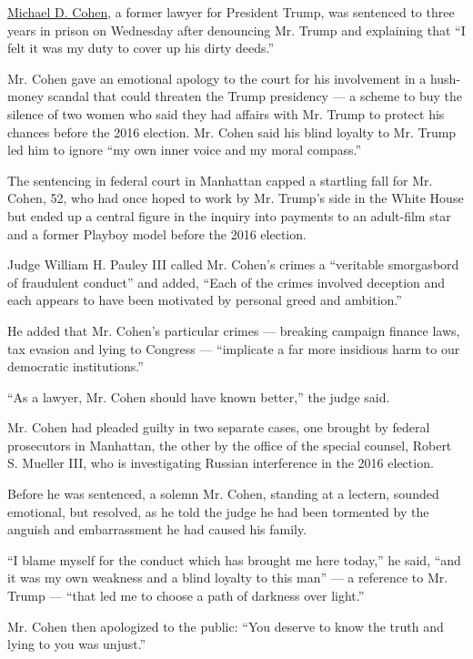 \href{https://www.nytimes.com/2020/07/21/nyregion/michael-cohen-trump-book.html}{Michael
D. Cohen}, a former lawyer for President Trump, was sentenced to three
years in prison on Wednesday after denouncing Mr. Trump and explaining
that ``I felt it was my duty to cover up his dirty deeds.''

Mr. Cohen gave an emotional apology to the court for his involvement in
a hush-money scandal that could threaten the Trump presidency --- a
scheme to buy the silence of two women who said they had affairs with
Mr. Trump to protect his chances before the 2016 election. Mr. Cohen
said his blind loyalty to Mr. Trump led him to ignore ``my own inner
voice and my moral compass.''

The sentencing in federal court in Manhattan capped a startling fall for
Mr. Cohen, 52, who had once hoped to work by Mr. Trump's side in the
White House but ended up a central figure in the inquiry into payments
to an adult-film star and a former Playboy model before the 2016
election.

Judge William H. Pauley III called Mr. Cohen's crimes a ``veritable
smorgasbord of fraudulent conduct'' and added, ``Each of the crimes
involved deception and each appears to have been motivated by personal
greed and ambition.''

He added that Mr. Cohen's particular crimes --- breaking campaign
finance laws, tax evasion and lying to Congress --- ``implicate a far
more insidious harm to our democratic institutions.''

``As a lawyer, Mr. Cohen should have known better,'' the judge said.

Mr. Cohen had pleaded guilty in two separate cases, one brought by
federal prosecutors in Manhattan, the other by the office of the special
counsel, Robert S. Mueller III, who is investigating Russian
interference in the 2016 election.

Before he was sentenced, a solemn Mr. Cohen, standing at a lectern,
sounded emotional, but resolved, as he told the judge he had been
tormented by the anguish and embarrassment he had caused his family.

``I blame myself for the conduct which has brought me here today,'' he
said, ``and it was my own weakness and a blind loyalty to this man'' ---
a reference to Mr. Trump --- ``that led me to choose a path of darkness
over light.''

Mr. Cohen then apologized to the public: ``You deserve to know the truth
and lying to you was unjust.''

